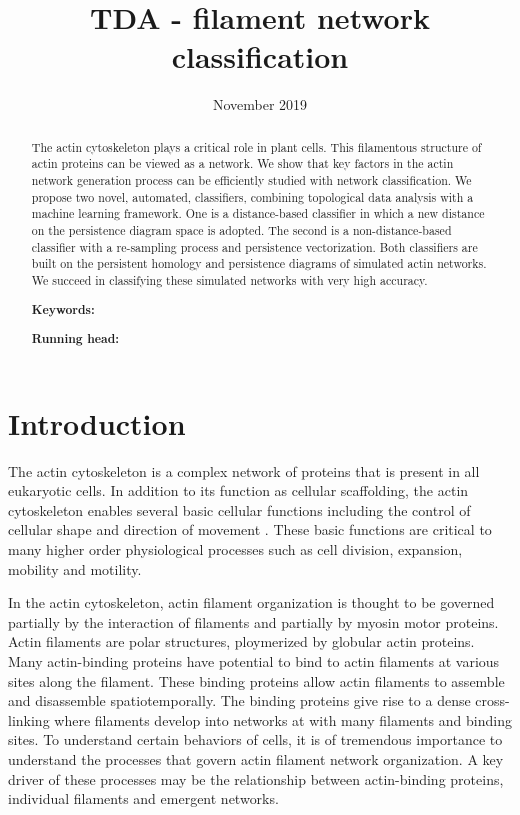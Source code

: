 \documentclass[10pt]{article}
\title{TDA - filament network classification}
\date{November 2019}
\begin{document}
\maketitle

\begin{abstract}

The actin cytoskeleton plays a critical role in plant cells. This filamentous structure of actin proteins can be viewed as a network. We show that key factors in the actin network generation process can be efficiently studied with network classification. We propose two novel, automated, classifiers, combining topological data analysis with a machine learning framework. One is a distance-based classifier in which a new distance on the persistence diagram space is adopted. The second is a non-distance-based classifier with a re-sampling process and persistence vectorization. Both classifiers are built on the persistent homology and persistence diagrams of simulated actin networks. We succeed in classifying these simulated networks with very high accuracy.

    \textbf{Keywords:} 
    
    \textbf{Running head:} 
\end{abstract}

\section{Introduction}
The actin cytoskeleton is a complex network of proteins that is present in all eukaryotic cells. In addition to its function as cellular scaffolding, the actin cytoskeleton enables several basic cellular functions including the control of cellular shape and direction of movement \cite{thomas2009actin}. These basic functions are critical to many higher order physiological processes such as cell division, expansion, mobility and motility\cite{freedman2017versatile}. 

In the actin cytoskeleton, actin filament organization is thought to be governed partially by the interaction of filaments and partially by myosin motor proteins. Actin filaments are polar structures, ploymerized by globular actin proteins. Many actin-binding proteins have potential to bind to actin filaments at various sites along the filament. These binding proteins allow actin filaments to assemble and disassemble spatiotemporally. The binding proteins give rise to a dense cross-linking where filaments develop into networks at with many filaments and binding sites. To understand certain behaviors of cells, it is of tremendous importance to understand the processes that govern actin filament network organization. A key driver of these processes may be the relationship between actin-binding proteins, individual filaments and emergent networks.
\end{document}
